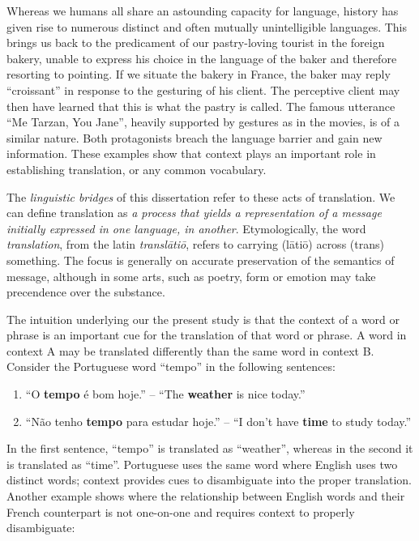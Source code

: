 Whereas we humans all share an astounding capacity for language, history has
given rise to numerous distinct and often mutually unintelligible languages.
This brings us back to the predicament of our pastry-loving tourist in the
foreign bakery, unable to express his choice in the language of the baker and
therefore resorting to pointing. If we situate the bakery in France, the baker
may reply ``croissant'' in response to the gesturing of his client. The
perceptive client may then have learned that this is what the pastry is called.
The famous utterance ``Me Tarzan, You Jane'', heavily supported by gestures as
in the movies, is of a similar nature. Both protagonists breach the language
barrier and gain new information. These examples show that context plays an
important role in establishing translation, or any common vocabulary.

The \emph{linguistic bridges} of this dissertation refer to these acts of
translation. We can define translation as \emph{a process that yields a
representation of a message initially expressed in one language, in another}.
Etymologically, the word \emph{translation}, from the latin \emph{transl\=ati\=o},
refers to carrying (l\=ati\=o) across (trans) something. The focus is generally on
accurate preservation of the semantics of message, although in some arts, such
as poetry, form or emotion may take precendence over the substance.

The intuition underlying our the present study is that the context of a word or phrase is
an important cue for the translation of that word or phrase. A word in context
A may be translated differently than the same word in context B. Consider the
Portuguese word ``tempo'' in the following sentences:

\begin{enumerate}
\item ``O \textbf{tempo} é bom hoje.'' -- ``The \textbf{weather} is nice today.''
\item ``Não tenho \textbf{tempo} para estudar hoje.'' -- ``I don't have \textbf{time} to study today.''
\end{enumerate}

In the first sentence, ``tempo'' is translated as ``weather'', whereas in the
second it is translated as ``time''. Portuguese uses the same word where
English uses two distinct words; context provides cues to disambiguate into the
proper translation. Another example shows where the relationship between English words and their French counterpart is
not one-on-one and requires context to properly disambiguate:

